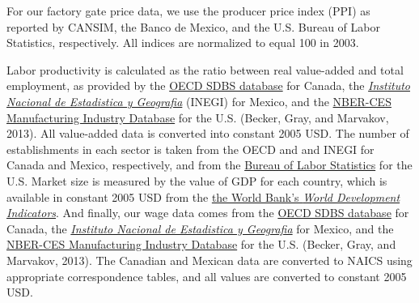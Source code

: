 For our factory gate price data, we use the producer price index (PPI) as reported 
by CANSIM, the Banco de Mexico, and the U.S. Bureau of Labor Statistics, respectively.
 All indices are normalized to equal 100 in 2003.

Labor productivity is calculated as the ratio between real value-added and total 
employment, as provided by the \href{http://stats.oecd.org/index.aspx?queryid=224}{OECD SDBS database} 
for Canada, the \href{http://buscador.inegi.org.mx/search?q=encuesta+industrial+anual&client=ProductosR&proxystylesheet=ProductosR&num=10&getfields=*&sort=meta:edicion:D:E:::D&entsp=a__inegi_politica_p72&lr=lang_es\%7Clang_en&oe=UTF-8&ie=UTF-8&ip=10.210.100.253&entqr=3&filter=0&site=ProductosBuscador&tlen=260&ulang=en&start=0}{\emph{Instituto Nacional de Estadistica y Geografia}} 
(INEGI) for Mexico, and the \href{http://www.nber.org/nberces/}{NBER-CES Manufacturing Industry Database}
 for the U.S. (Becker, Gray, and Marvakov, 2013). All value-added data is 
converted into constant 2005 USD. The number of establishments in each sector is 
taken from the OECD and and INEGI for Canada and Mexico, respectively, and from 
the \href{http://www.bls.gov/cew/doc/titles/ownership/ownership_titles.htm}{Bureau of Labor Statistics} 
for the U.S. Market size is measured by the value of GDP for each country, which 
is available in constant 2005 USD from the \href{http://data.worldbank.org/data-catalog/world-development-indicators}{the World Bank's \emph{World Development Indicators}}.
 And finally, our wage data comes from the \href{http://stats.oecd.org/index.aspx?queryid=224}{OECD SDBS database} 
for Canada, the \href{http://buscador.inegi.org.mx/search?q=encuesta+industrial+anual&client=ProductosR&proxystylesheet=ProductosR&num=10&getfields=*&sort=meta:edicion:D:E:::D&entsp=a__inegi_politica_p72&lr=lang_es\%7Clang_en&oe=UTF-8&ie=UTF-8&ip=10.210.100.253&entqr=3&filter=0&site=ProductosBuscador&tlen=260&ulang=en&start=0}{\emph{Instituto Nacional de Estadistica y Geografia}} for Mexico, and the \href{http://www.nber.org/nberces/}{NBER-CES Manufacturing Industry Database} for the U.S. (Becker, Gray, and Marvakov, 2013). The Canadian and Mexican data are converted to NAICS using appropriate correspondence tables, and all values are converted to constant 2005 USD. 

